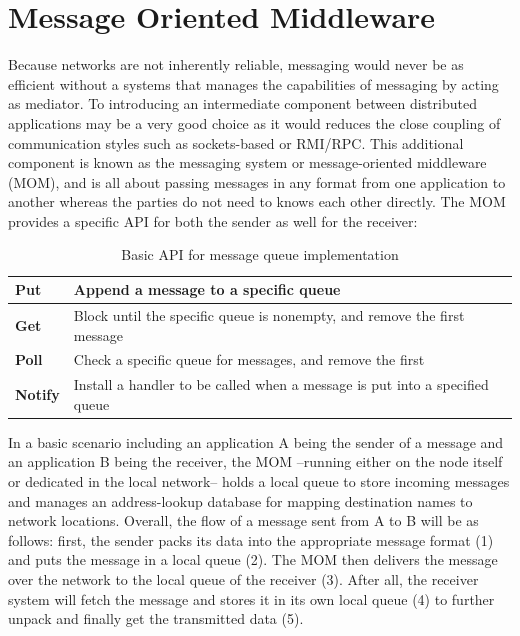 \newpage

\section{Message Oriented Middleware}
\label{intro-messaging-mom}

Because networks are not inherently reliable, messaging would never be as
efficient without a systems that manages the capabilities of messaging by acting
as mediator. To introducing an intermediate component between distributed
applications may be a very good choice as it would reduces the close coupling of
communication styles such as sockets-based or RMI/RPC. This additional component
is known as the messaging system or message-oriented middleware (MOM), and is
all about passing messages in any format from one application to another whereas
the parties do not need to knows each other directly. \cite{TAN06} The MOM
provides a specific API for both the sender as well for the receiver:

\begin{table}[H]
\centering
\begin{tabular}{|l|l|}
\hline
\textbf{Put}    & Append a message to a specific queue                                        \\ \hline
\textbf{Get}    & Block until the specific queue is nonempty, and remove the first message    \\ \hline
\textbf{Poll}   & Check a specific queue for messages, and remove the first                   \\ \hline
\textbf{Notify} & Install a handler to be called when a message is put into a specified queue \\ \hline
\end{tabular}
\caption{Basic API for message queue implementation \cite{TAN06}}
\end{table}

In a basic scenario including an application A being the sender of a message and
an application B being the receiver, the MOM --running either on the node itself
or dedicated in the local network-- holds a local queue to store incoming
messages and manages an address-lookup database for mapping destination names to
network locations. Overall, the flow of a message sent from A to B will be as
follows: first, the sender packs its data into the appropriate message format
(1) and puts the message in a local queue (2). The MOM then delivers the message
over the network to the local queue of the receiver (3). After all, the receiver
system will fetch the message and stores it in its own local queue (4) to
further unpack and finally get the transmitted data (5).

